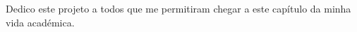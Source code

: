 

\frontmatter %

\pagestyle{plain} %


\maketitlepage


\integritystatement

%
\begin{dedicatory}
Dedico este projeto a todos que me permitiram chegar a este capítulo da minha vida académica.
\end{dedicatory}


